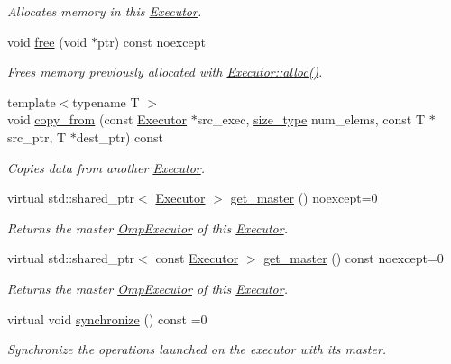 \begin{DoxyCompactItemize}
\begin{DoxyCompactList}\small\item\em Allocates memory in this \hyperlink{classgko_1_1Executor}{Executor}. \end{DoxyCompactList}\item 
void \hyperlink{classgko_1_1Executor_a0befe43d21c93e199d1620eaae4ccc0c}{free} (void $\ast$ptr) const noexcept
\begin{DoxyCompactList}\small\item\em Frees memory previously allocated with \hyperlink{classgko_1_1Executor_a5a216c2b1f7ceb8a0190c08941c1c687}{Executor\+::alloc()}. \end{DoxyCompactList}\item 
{\footnotesize template$<$typename T $>$ }\\void \hyperlink{classgko_1_1Executor_adf7573e4a7e267fcb821eb9049a1054f}{copy\+\_\+from} (const \hyperlink{classgko_1_1Executor}{Executor} $\ast$src\+\_\+exec, \hyperlink{namespacegko_a6e5c95df0ae4e47aab2f604a22d98ee7}{size\+\_\+type} num\+\_\+elems, const T $\ast$src\+\_\+ptr, T $\ast$dest\+\_\+ptr) const
\begin{DoxyCompactList}\small\item\em Copies data from another \hyperlink{classgko_1_1Executor}{Executor}. \end{DoxyCompactList}\item 
virtual std\+::shared\+\_\+ptr$<$ \hyperlink{classgko_1_1Executor}{Executor} $>$ \hyperlink{classgko_1_1Executor_acaec4f999d52fc71e5e5a3d3ad93609c}{get\+\_\+master} () noexcept=0
\begin{DoxyCompactList}\small\item\em Returns the master \hyperlink{classgko_1_1OmpExecutor}{Omp\+Executor} of this \hyperlink{classgko_1_1Executor}{Executor}. \end{DoxyCompactList}\item 
virtual std\+::shared\+\_\+ptr$<$ const \hyperlink{classgko_1_1Executor}{Executor} $>$ \hyperlink{classgko_1_1Executor_a261386e439c8daa6e0d95dc331b9bfeb}{get\+\_\+master} () const noexcept=0
\begin{DoxyCompactList}\small\item\em Returns the master \hyperlink{classgko_1_1OmpExecutor}{Omp\+Executor} of this \hyperlink{classgko_1_1Executor}{Executor}. \end{DoxyCompactList}\item 
\mbox{\label{classgko_1_1Executor_a24eeee7648c0f0fd07c9866d07154875}} 
virtual void \hyperlink{classgko_1_1Executor_a24eeee7648c0f0fd07c9866d07154875}{synchronize} () const =0
\begin{DoxyCompactList}\small\item\em Synchronize the operations launched on the executor with its master. \end{DoxyCompactList}\end{DoxyCompactItemize}
